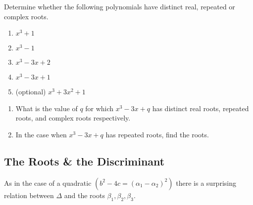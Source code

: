 \begin{questions}[resume]
  \item Determine whether the following polynomials have distinct real, repeated or complex roots. 
	\begin{enumerate}
		\item $ x^3 + 1$
		\item $ x^3 - 1$
		\item $ x^3 - 3x + 2 $
		\item $ x^3 - 3x + 1 $
		\item (optional) $x^3 + 3x^2 + 1$
	\end{enumerate}
\end{questions}

\begin{questions}[resume]
	\item \begin{enumerate}
		\item What is the value of $ q$ for which $ x^3 -3x + q$ has distinct real roots, repeated roots, and complex roots respectively.
		\item In the case when $ x^3 - 3x + q$ has repeated roots, find the roots.
	\end{enumerate}
\end{questions}






\newpage
\subsection{The Roots \& the Discriminant}
As in the case of a quadratic $\left( b^2 - 4c = (\alpha_1 - \alpha_2)^2 \right)$ there is a surprising relation between $ \Delta$ and the roots $ \beta_1, \beta_2, \beta_3$. 

